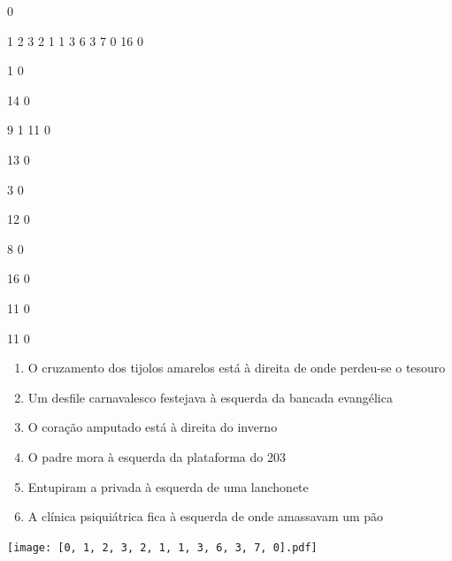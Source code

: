 \documentclass[12pt]{article}
\begin{document}
		\vfill  
		  
{
	0	%

	1	%
	2	%
	3	%
	2	%
	1	%
	1	%
	3	%
	6	%
	3	%
	7	%
	0	%
	16	%
	0	%

	1	%
	0	%

	14	%
	0	%

	9	%
	1	%
	11	%
	0	%

	13	%
	0	%

	3	%
	0	%

	12	%
	0	%

	8	%
	0	%

	16	%
	0	%

	11	%
	0	%

	11	%
	0	%

}	  
		    	

		 

\pagebreak


	\begin{enumerate}
		  \sffamily %
		  \large %


\vfill \item
O cruzamento dos tijolos amarelos está	%
à direita
de onde perdeu-se o tesouro	%

\vfill \item
Um desfile carnavalesco festejava	%
à esquerda
da bancada evangélica	%

\vfill \item
O coração amputado está	%
à direita
do inverno	%

\vfill \item
O padre mora	%
à esquerda
da plataforma do 203	%

\vfill \item
Entupiram a privada	%
à esquerda
de uma lanchonete	%

\vfill \item
A clínica psiquiátrica fica	%
à esquerda
de onde amassavam um pão	%
	\end{enumerate}
		  
		  \hfill

		  \vfill

\texttt{[image: [0, 1, 2, 3, 2, 1, 1, 3, 6, 3, 7, 0].pdf]}
\end{document}
